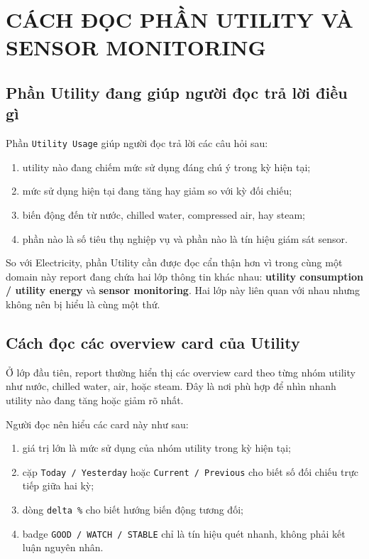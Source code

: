 \chapter{CÁCH ĐỌC PHẦN UTILITY VÀ SENSOR MONITORING}

\section{Phần Utility đang giúp người đọc trả lời điều gì}

Phần \texttt{Utility Usage} giúp người đọc trả lời các câu hỏi sau:

\begin{enumerate}[label=-]
\item utility nào đang chiếm mức sử dụng đáng chú ý trong kỳ hiện tại;
\item mức sử dụng hiện tại đang tăng hay giảm so với kỳ đối chiếu;
\item biến động đến từ nước, chilled water, compressed air, hay steam;
\item phần nào là số tiêu thụ nghiệp vụ và phần nào là tín hiệu giám sát sensor.
\end{enumerate}

So với Electricity, phần Utility cần được đọc cẩn thận hơn vì trong cùng một domain này report đang chứa hai lớp thông tin khác nhau: \textbf{utility consumption / utility energy} và \textbf{sensor monitoring}. Hai lớp này liên quan với nhau nhưng không nên bị hiểu là cùng một thứ.

\section{Cách đọc các overview card của Utility}

Ở lớp đầu tiên, report thường hiển thị các overview card theo từng nhóm utility như nước, chilled water, air, hoặc steam. Đây là nơi phù hợp để nhìn nhanh utility nào đang tăng hoặc giảm rõ nhất.

Người đọc nên hiểu các card này như sau:

\begin{enumerate}[label=-]
\item giá trị lớn là mức sử dụng của nhóm utility trong kỳ hiện tại;
\item cặp \texttt{Today / Yesterday} hoặc \texttt{Current / Previous} cho biết số đối chiếu trực tiếp giữa hai kỳ;
\item dòng \texttt{delta \%} cho biết hướng biến động tương đối;
\item badge \texttt{GOOD / WATCH / STABLE} chỉ là tín hiệu quét nhanh, không phải kết luận nguyên nhân.
\end{enumerate}

